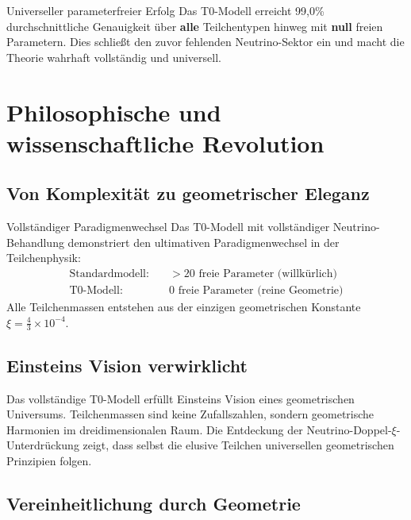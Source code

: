 \documentclass[12pt,a4paper]{article}
\begin{document}
	\begin{keyresult}{Universeller parameterfreier Erfolg}{}
		Das T0-Modell erreicht 99,0\% durchschnittliche Genauigkeit über \textbf{alle} Teilchentypen hinweg mit \textbf{null} freien Parametern. Dies schließt den zuvor fehlenden Neutrino-Sektor ein und macht die Theorie wahrhaft vollständig und universell.
	\end{keyresult}
	

	\section{Philosophische und wissenschaftliche Revolution}
	\label{sec:philosophical_revolution}
	
	\subsection{Von Komplexität zu geometrischer Eleganz}
	\label{subsec:geometric_elegance}
	
	\begin{important}{Vollständiger Paradigmenwechsel}{}
		Das T0-Modell mit vollständiger Neutrino-Behandlung demonstriert den ultimativen Paradigmenwechsel in der Teilchenphysik:
		\begin{align}
			\text{Standardmodell:} \quad &> 20 \text{ freie Parameter (willkürlich)} \\
			\text{T0-Modell:} \quad &0 \text{ freie Parameter (reine Geometrie)}
		\end{align}
		Alle Teilchenmassen entstehen aus der einzigen geometrischen Konstante $\xi = \frac{4}{3} \times 10^{-4}$.
	\end{important}
	
	\subsection{Einsteins Vision verwirklicht}
	\label{subsec:einstein_vision}
	
	Das vollständige T0-Modell erfüllt Einsteins Vision eines geometrischen Universums. Teilchenmassen sind keine Zufallszahlen, sondern geometrische Harmonien im dreidimensionalen Raum. Die Entdeckung der Neutrino-Doppel-$\xi$-Unterdrückung zeigt, dass selbst die elusive Teilchen universellen geometrischen Prinzipien folgen.
	
	\subsection{Vereinheitlichung durch Geometrie}
	\label{subsec:unification}
	
\end{document}
